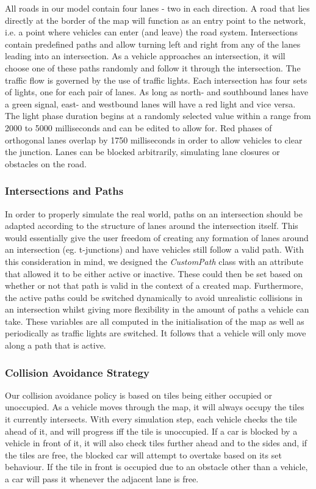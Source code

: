 All roads in our model contain four lanes - two in each direction. A road that lies directly at the border of the map will function as an entry point to the network, i.e. a point where vehicles can enter (and leave) the road system. Intersections contain predefined paths and allow turning left and right from any of the lanes leading into an intersection. As a vehicle approaches an intersection, it will choose one of these paths randomly and follow it through the intersection. The traffic flow is governed by the use of traffic lights. Each intersection has four sets of lights, one for each pair of lanes. As long as north- and southbound lanes have a green signal, east- and westbound lanes will have a red light and vice versa. The light phase duration begins at a randomly selected value within a range from 2000 to 5000 milliseconds and can be edited to allow for. Red phases of orthogonal lanes overlap by 1750 milliseconds in order to allow vehicles to clear the junction. Lanes can be blocked arbitrarily, simulating lane closures or obstacles on the road.

\subsubsection*{Intersections and Paths}
In order to properly simulate the real world, paths on an intersection should be adapted according to the structure of lanes around the intersection itself. This would essentially give the user freedom of creating any formation of lanes around an intersection (eg. t-junctions) and have vehicles still follow a valid path. With this consideration in mind, we designed the \textit{CustomPath} class with an attribute that allowed it to be either active or inactive. These could then be set based on whether or not that path is valid in the context of a created map. Furthermore, the active paths could be switched dynamically to avoid unrealistic collisions in an intersection whilst giving more flexibility in the amount of paths a vehicle can take. These variables are all computed in the initialisation of the map as well as periodically as traffic lights are switched. It follows that a vehicle will only move along a path that is active.



\subsubsection*{Collision Avoidance Strategy}

Our collision avoidance policy is based on tiles being either occupied or unoccupied. As a vehicle moves through the map, it will always occupy the tiles it currently intersects. With every simulation step, each vehicle checks the tile ahead of it, and will progress iff the tile is unoccupied. If a car is blocked by a vehicle in front of it, it will also check tiles further ahead and to the sides and, if the tiles are free, the blocked car will attempt to overtake based on its set behaviour. If the tile in front is occupied due to an obstacle other than a vehicle, a car will pass it whenever the adjacent lane is free.


